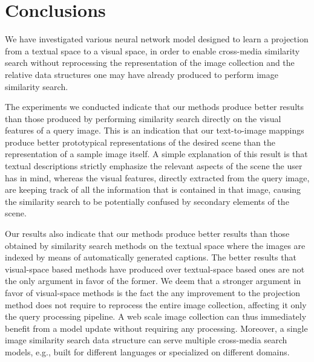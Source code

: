 \section{Conclusions}
\label{sec:t2v:conclusions}

We have investigated various neural network model designed to learn a projection from a textual space to a visual space, in order to enable cross-media similarity search without reprocessing the representation of the image collection and the relative data structures one may have already produced to perform image similarity search.

The experiments we conducted indicate that our methods produce better results than those produced by performing similarity search directly on the visual features of a query image.
This is an indication that our text-to-image mappings produce better prototypical representations of the desired scene than the representation of a sample image itself.
A simple explanation of this result is that textual descriptions strictly emphasize the relevant aspects of the scene the user has in mind, whereas the visual features, directly extracted from the query image, are keeping track of all the information that is contained in that image, causing the similarity search to be potentially confused by secondary elements of the scene.

Our results also indicate that our methods produce better results than those obtained by similarity search methods on the textual space where the images are indexed by means of automatically generated captions.
The better results that visual-space based methods have produced over textual-space based ones are not the only argument in favor of the former.
We deem that a stronger argument in favor of visual-space methods is the fact the any improvement to the projection method does not require to reprocess the entire image collection, affecting it only the query processing pipeline.
A web scale image collection can thus immediately benefit from a model update without requiring any processing.
Moreover, a single image similarity search data structure can serve multiple cross-media search models, e.g., built for different languages or specialized on different domains.

